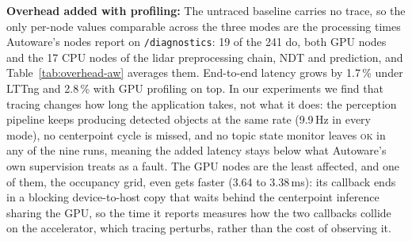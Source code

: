 \noindent
\textbf{Overhead added with profiling:}
The untraced baseline carries no trace, so the only per-node values comparable across the three modes are the processing times Autoware's nodes report on \texttt{/diagnostics}: 19 of the 241 do, both GPU nodes and the 17 CPU nodes of the lidar preprocessing chain, NDT and prediction, and Table~\ref{tab:overhead-aw} averages them. End-to-end latency grows by 1.7\,\% under LTTng and 2.8\,\% with GPU profiling on top. In our experiments we find that tracing changes how long the application takes, not what it does: the perception pipeline keeps producing detected objects at the same rate (9.9\,Hz in every mode), no centerpoint cycle is missed, and no topic state monitor leaves
\textsc{ok} in any of the nine runs, meaning the added latency stays below what
Autoware's own supervision treats as a fault.
The GPU nodes are the least affected, and one of them, the occupancy grid, even gets faster (3.64 to 3.38\,ms): its callback ends in a blocking device-to-host copy that waits behind the centerpoint inference sharing the GPU, so the time it reports measures how the two callbacks collide on the accelerator, which tracing perturbs, rather than the cost of observing it.
